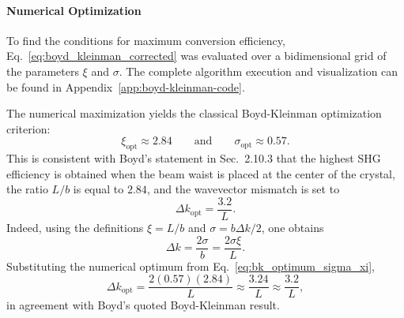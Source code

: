 \begin{resolucao}[Solution]
    \paragraph*{Numerical Optimization}
        To find the conditions for maximum conversion efficiency, Eq.~\eqref{eq:boyd_kleinman_corrected} was evaluated over a bidimensional grid of the parameters $\xi$ and $\sigma$. The complete algorithm execution and visualization can be found in Appendix~\ref{app:boyd-kleinman-code}.

        The numerical maximization yields the classical Boyd-Kleinman optimization criterion:
        \begin{equation}
            \xi_{\mathrm{opt}}
            \approx 2.84
            \qquad
            \text{and}
            \qquad
            \sigma_{\mathrm{opt}}
            \approx 0.57.
            \label{eq:bk_optimum_sigma_xi}
        \end{equation}
        This is consistent with Boyd's statement in Sec.~2.10.3 that the highest SHG efficiency is obtained when the beam waist is placed at the center of the crystal, the ratio $L/b$ is equal to $2.84$, and the wavevector mismatch is set to
        \begin{equation}
            \Delta k_{\mathrm{opt}}
            =
            \frac{3.2}{L}.
            \label{eq:boyd_delta_k_optimum}
        \end{equation}
        Indeed, using the definitions $\xi=L/b$ and $\sigma=b\Delta k/2$, one obtains
        \begin{equation}
            \Delta k
            =
            \frac{2\sigma}{b}
            =
            \frac{2\sigma\xi}{L}.
        \end{equation}
        Substituting the numerical optimum from Eq.~\eqref{eq:bk_optimum_sigma_xi},
        \begin{equation}
            \Delta k_{\mathrm{opt}}
            =
            \frac{
            2(0.57)(2.84)
            }{
            L
            }
            \approx
            \frac{3.24}{L}
            \approx
            \frac{3.2}{L},
        \end{equation}
        in agreement with Boyd's quoted Boyd-Kleinman result.


\end{resolucao}
